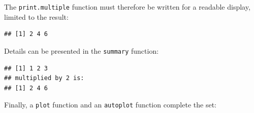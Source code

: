 \documentclass[
  12pt,
  american,
  a4paper,
  extrafontsizes,onecolumn,openright
  ]{memoir}
\newenvironment{Shaded}{\begin{snugshade}}{\end{snugshade}}
\newcommand{\CommentTok}[1]{\textcolor[rgb]{0.56,0.35,0.01}{\textit{#1}}}
\newcommand{\ControlFlowTok}[1]{\textcolor[rgb]{0.13,0.29,0.53}{\textbf{#1}}}
\newcommand{\FunctionTok}[1]{\textcolor[rgb]{0.13,0.29,0.53}{\textbf{#1}}}
\newcommand{\NormalTok}[1]{#1}
\newcommand{\OtherTok}[1]{\textcolor[rgb]{0.56,0.35,0.01}{#1}}
\newcommand{\SpecialCharTok}[1]{\textcolor[rgb]{0.81,0.36,0.00}{\textbf{#1}}}
\newcommand{\StringTok}[1]{\textcolor[rgb]{0.31,0.60,0.02}{#1}}
\begin{document}
\normalsize

The \texttt{print.multiple} function must therefore be written for a readable display, limited to the result:

\scriptsize

\begin{Shaded}
\end{Shaded}

\begin{verbatim}
## [1] 2 4 6
\end{verbatim}

\normalsize

Details can be presented in the \texttt{summary} function:

\scriptsize

\begin{Shaded}
\end{Shaded}

\begin{verbatim}
## [1] 1 2 3
## multiplied by 2 is:
## [1] 2 4 6
\end{verbatim}

\normalsize

Finally, a \texttt{plot} function and an \texttt{autoplot} function complete the set:

\scriptsize
\end{document}
